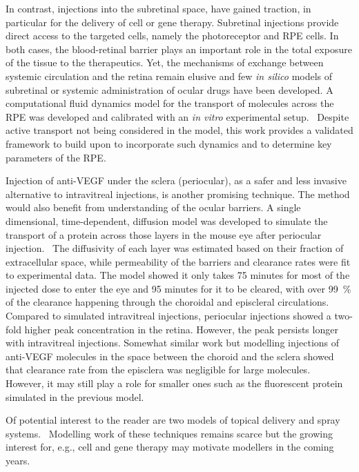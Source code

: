 \documentclass{article}
\begin{document}
In contrast, injections into the subretinal space, have gained traction, in particular for the delivery of cell or gene therapy.
Subretinal injections provide direct access to the targeted cells, namely the photoreceptor and RPE cells.
In both cases, the blood-retinal barrier plays an important role in the total exposure of the tissue to the therapeutics.
Yet, the mechanisms of exchange between systemic circulation and the retina remain elusive and few \textit{in silico} models of subretinal or systemic administration of ocular drugs have been developed.
A computational fluid dynamics model for the transport of molecules across the RPE was developed and calibrated with an \textit{in vitro} experimental setup.~\cite{Davies_2020}
Despite active transport not being considered in the model, this work provides a validated framework to build upon to incorporate such dynamics and to determine key parameters of the RPE.

Injection of anti-VEGF under the sclera (periocular), as a safer and less invasive alternative to intravitreal injections, is another promising technique.
The method would also benefit from understanding of the ocular barriers.
A single dimensional, time-dependent, diffusion model was developed to simulate the transport of a protein across those layers in the mouse eye after periocular injection.~\cite{Gabhann_2007}
The diffusivity of each layer was estimated based on their fraction of extracellular space, while permeability of the barriers and clearance rates were fit to experimental data.
The model showed it only takes 75 minutes for most of the injected dose to enter the eye and 95 minutes for it to be cleared, with over \SI{99}{\percent} of the clearance happening through the choroidal and episcleral circulations.
Compared to simulated intravitreal injections, periocular injections showed a two-fold higher peak concentration in the retina.
However, the peak persists longer with intravitreal injections.
Somewhat similar work but modelling injections of anti-VEGF molecules in the space between the choroid and the sclera showed that clearance rate from the episclera was negligible for large molecules.~\cite{Zhang_2018}
However, it may still play a role for smaller ones such as the fluorescent protein simulated in the previous model.~\cite{Gabhann_2007}

Of potential interest to the reader are two models of topical delivery and spray systems.~\cite{Mori_2017,Nweze_2020}
Modelling work of these techniques remains scarce but the growing interest for, e.g., cell and gene therapy may motivate modellers in the coming years.
\end{document}
